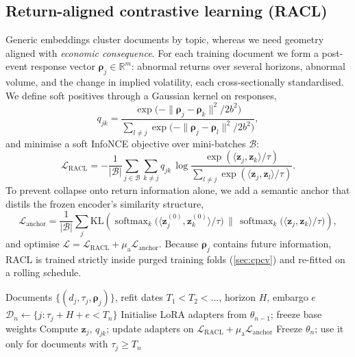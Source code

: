 \documentclass[11pt,a4paper]{article}
\theoremstyle{plain}
\theoremstyle{definition}
\theoremstyle{remark}
\newcommand{\R}{\mathbb{R}}
\newcommand{\z}{\bm{z}}
\begin{document}
\subsection{Return-aligned contrastive learning (RACL)}
Generic embeddings cluster documents by topic, whereas we need geometry aligned with \emph{economic consequence}. For each training document we form a post-event response vector $\bm\rho_j\in\R^{m}$: abnormal returns over several horizons, abnormal volume, and the change in implied volatility, each cross-sectionally standardised. We define soft positives through a Gaussian kernel on responses,
\begin{equation}
  q_{jk} = \frac{\exp\!\big(-\|\bm\rho_j-\bm\rho_k\|^2/2b^2\big)}{\sum_{l\ne j}\exp\!\big(-\|\bm\rho_j-\bm\rho_l\|^2/2b^2\big)},
\end{equation}
and minimise a soft InfoNCE objective \citep{oord2018} over mini-batches $\mathcal{B}$:
\begin{equation}
  \mathcal{L}_{\mathrm{RACL}} = -\frac{1}{|\mathcal{B}|}\sum_{j\in\mathcal{B}}\sum_{k\ne j} q_{jk}\,
  \log\frac{\exp(\langle\z_j,\z_k\rangle/\tau)}{\sum_{l\ne j}\exp(\langle\z_j,\z_l\rangle/\tau)} .
\end{equation}
To prevent collapse onto return information alone, we add a semantic anchor that distils the frozen encoder's similarity structure,
\begin{equation}
  \mathcal{L}_{\mathrm{anchor}} = \frac{1}{|\mathcal{B}|}\sum_{j}\mathrm{KL}\!\left(\operatorname{softmax}_k\!\big(\langle\z^{(0)}_j,\z^{(0)}_k\rangle/\tau\big)\,\Big\|\,\operatorname{softmax}_k\!\big(\langle\z_j,\z_k\rangle/\tau\big)\right),
\end{equation}
and optimise $\mathcal{L}=\mathcal{L}_{\mathrm{RACL}}+\mu_{\mathrm{a}}\mathcal{L}_{\mathrm{anchor}}$. Because $\bm\rho_j$ contains future information, RACL is trained strictly inside purged training folds (\cref{sec:cpcv}) and re-fitted on a rolling schedule.

\begin{algorithm}[ht]
\caption{Rolling return-aligned contrastive fine-tuning}\label{alg:racl}
\begin{algorithmic}[1]
\Require Documents $\{(d_j,\tau_j,\bm\rho_j)\}$, refit dates $T_1<T_2<\dots$, horizon $H$, embargo $e$
  \State $\mathcal{D}_n\gets\{j:\tau_j + H + e < T_n\}$ 
  \State Initialise LoRA adapters from $\theta_{n-1}$; freeze base weights
      \State Compute $\z_j$, $q_{jk}$; update adapters on $\mathcal{L}_{\mathrm{RACL}}+\mu_{\mathrm{a}}\mathcal{L}_{\mathrm{anchor}}$
    \EndFor
  \EndFor
  \State Freeze $\theta_n$; use it only for documents with $\tau_j\ge T_n$
\EndFor
\end{algorithmic}
\end{algorithm}
\end{document}
